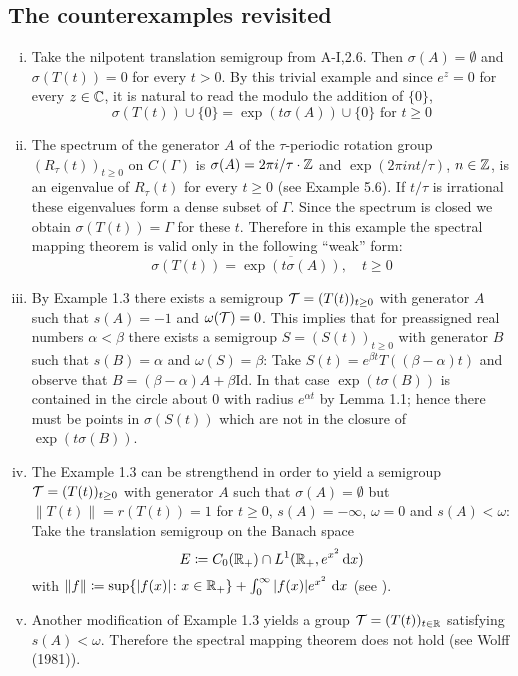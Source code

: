 \subsection{The counterexamples revisited}\label{subsec:a3-6.1}
\begin{enumerate}[(i), wide]

\item
Take the nilpotent translation semigroup from A-I,2.6. Then $\sigma(A) = \emptyset$ and $\sigma(T(t)) = 0$ for every $t > 0$.
By this trivial example and since $e^{z} = 0$ for every $z \in \mathbb{C}$, it is natural to read the  modulo the addition of $\{0\}$, \ie
\[
\sigma(T(t)) \cup \{0\} = \exp(t\sigma(A)) \cup \{0\} \text{ for } t \geq 0
\]
\item
The spectrum of the generator $A$ of the $\tau$-periodic rotation group $(R_{\tau}(t))_{t \geq 0}$ on $C(\Gamma)$ is $\sigma(A) = 2\pi i/\tau\cdot\mathbb{Z}$ and $\exp(2\pi int/\tau)$, $n \in \mathbb{Z}$, is an eigenvalue of $R_{\tau}(t)$ for every $t \geq 0$ (see Example 5.6).
If $t/\tau$ is irrational these eigenvalues form a dense subset of $\Gamma$.
Since the spectrum is closed we obtain $\sigma(T(t)) = \Gamma$ for these $t$.
Therefore in this example the spectral mapping theorem is valid only in the following \enquote{weak} form:
\[
\sigma(T(t)) = \overline{\exp(t\sigma(A))}, \quad t \geq 0
\]

\item 
By Example 1.3 there exists a semigroup $\mathcal{T} = (T(t))_{t \geq 0}$ with generator $A$ such that $s(A) = -1$ and $\omega(\mathcal{T}) = 0$.
This implies that for preassigned real numbers $\alpha < \beta$ there exists a semigroup $S = (S(t))_{t \geq 0}$ with generator $B$ such that $s(B) = \alpha$ and $\omega(S) = \beta$: Take $S(t) = e^{\beta t}T((\beta - \alpha)t)$ and observe that $B = (\beta-\alpha)A + \beta\text{Id}$.
In that case $\exp(t\sigma(B))$ is contained in the circle about $0$ with radius $e^{\alpha t}$ by Lemma 1.1; hence there must be points in $\sigma(S(t))$ which are not in the closure of $\exp(t\sigma(B))$.

\item 
The Example 1.3 can be strengthend in order to yield a semigroup $\mathcal{T} = (T(t))_{t \geq 0}$ with generator $A$ such that $\sigma(A) = \emptyset$ but $\|T(t)\| = r(T(t)) = 1$ for $t \geq 0$, \ie $s(A) = -\infty$, $\omega = 0$ and $s(A) < \omega$:
Take the translation semigroup on the Banach space
\[
E \coloneqq C_{0}(\mathbb{R}_{+}) \cap L^{1}(\mathbb{R}_{+}, e^{x^{2}}\mathop{}\!\mathrm{d}{x})
\]
with $\|f\| \coloneqq \sup \{|f(x)| \colon x \in \mathbb{R}_{+}\} + \int_{0}^{\infty} |f(x)|e^{x^{2}} \, \mathop{}\!\mathrm{d}{x}$ (see \citet{greinervoigtwolff:1981}).

\item 
Another modification of Example 1.3 yields a group $\mathcal{T} = (T(t))_{t \in \mathbb{R}}$ satisfying $s(A) < \omega$.
Therefore the spectral mapping theorem does not hold (see Wolff (1981)).
\end{enumerate}
